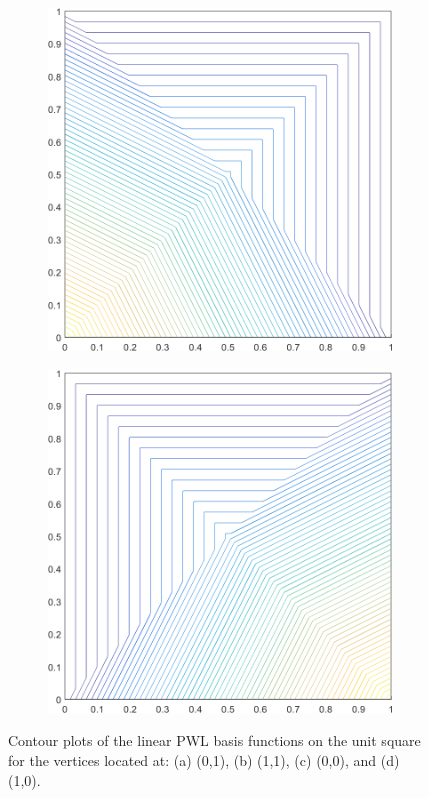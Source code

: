 \begin{figure}
\begin{subfigure}[b]{0.39\textwidth}
		\caption{}
	\end{subfigure}
	\vfill
	\begin{subfigure}[b]{0.39\textwidth}
		\centering
		\includegraphics[width=\textwidth]{figures/sec_BF/square_PWLD1_contour_b1.png}
		\caption{}
	\end{subfigure}
	\hspace{1.5cm}
	\begin{subfigure}[b]{0.39\textwidth}
		\centering
		\includegraphics[width=\textwidth]{figures/sec_BF/square_PWLD1_contour_b2.png}
		\caption{}
	\end{subfigure}
\caption{Contour plots of the linear PWL basis functions on the unit square for the vertices located at: (a) (0,1), (b) (1,1), (c) (0,0), and (d) (1,0).}
\label{fig::2D_PWLD1_unit_square_basis_functions}
\end{figure}

